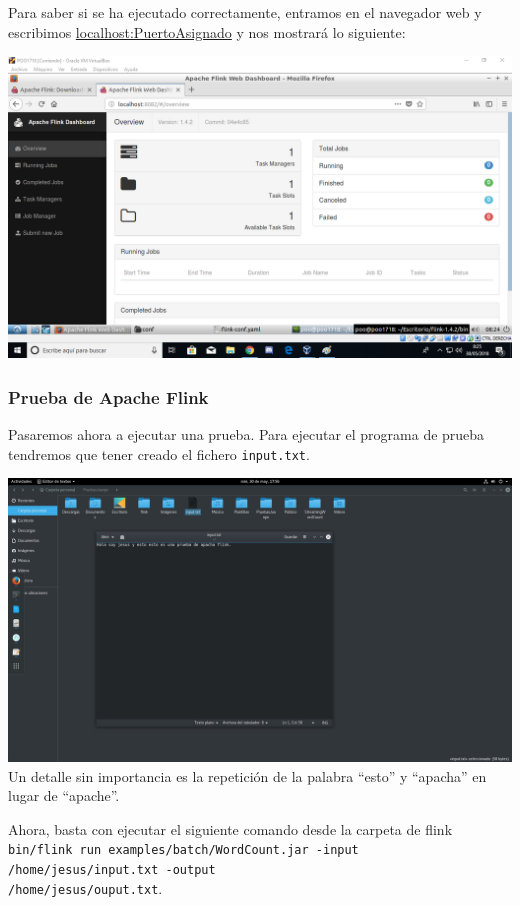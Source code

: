 \documentclass[12pt,letterpaper]{article}
\begin{document}
Para saber si se ha ejecutado correctamente, entramos en el navegador web y escribimos \url{localhost:PuertoAsignado} y nos mostrará lo siguiente:
\begin{center}
	\includegraphics[scale=0.5]{9.png}
\end{center}

\subsubsection{Prueba de Apache Flink}
Pasaremos ahora a ejecutar una prueba. Para ejecutar el programa de prueba tendremos que tener creado el fichero \texttt{input.txt}.
\begin{center}
	\includegraphics[scale=0.24]{13.png}
	Un detalle sin importancia es la repetición de la palabra ``esto'' y ``apacha'' en lugar de ``apache''.
\end{center}

Ahora, basta con ejecutar el siguiente comando desde la carpeta de flink \texttt{bin/flink run examples/batch/WordCount.jar -input /home/jesus/input.txt -output}\\\texttt{/home/jesus/ouput.txt}.\\
\end{document}
